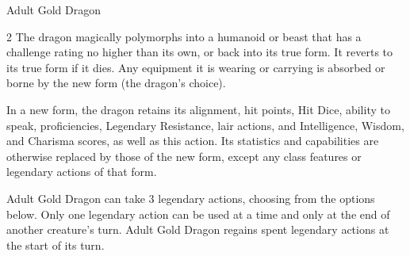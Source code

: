 \documentclass[10pt,a4paper,twoside,bg=print,twocolumn,openany,nodeprecatedcode]{dndbook}
\begin{document}
\begin{DndMonster}[float*=b,width=\textwidth + 8pt]{Adult Gold Dragon}
\begin{multicols}{2}
The dragon magically polymorphs into a humanoid or beast that has a challenge rating no higher than its own, or back into its true form. It reverts to its true form if it dies. Any equipment it is wearing or carrying is absorbed or borne by the new form (the dragon's choice).

In a new form, the dragon retains its alignment, hit points, Hit Dice, ability to speak, proficiencies, Legendary Resistance, lair actions, and Intelligence, Wisdom, and Charisma scores, as well as this action. Its statistics and capabilities are otherwise replaced by those of the new form, except any class features or legendary actions of that form.

Adult Gold Dragon can take 3 legendary actions, choosing from the options below. Only one legendary action can be used at a time and only at the end of another creature's turn. Adult Gold Dragon regains spent legendary actions at the start of its turn.

\begin{DndMonsterLegendaryActions}
\end{DndMonsterLegendaryActions}
\end{multicols}
\end{DndMonster}
\end{document}
